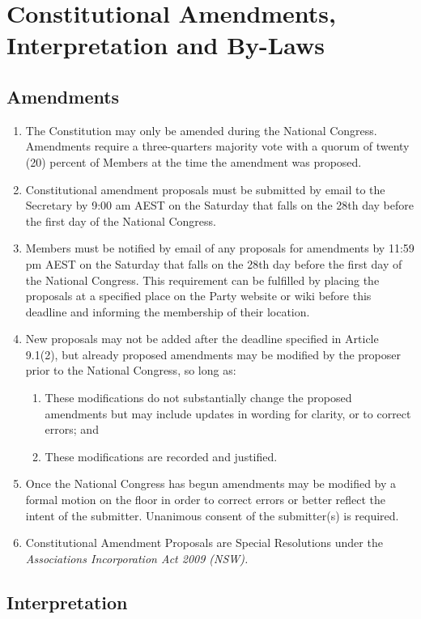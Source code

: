 \documentclass[a4paper,titlepage,8.5pt]{article}
\begin{document}
\section{Constitutional Amendments, Interpretation and By-Laws}

\subsection{Amendments}

\begin{enumerate}
\item The Constitution may only be amended during the National Congress. Amendments require a three-quarters majority vote with a quorum of twenty (20) percent of Members at the time the amendment was proposed.
\item Constitutional amendment proposals must be submitted by email to the Secretary by 9:00 am AEST on the Saturday that falls on the 28th day before the first day of the National Congress.
\item Members must be notified by email of any proposals for amendments by 11:59 pm AEST on the Saturday that falls on the 28th day before the first day of the National Congress. This requirement can be fulfilled by placing the proposals at a specified place on the Party website or wiki before this deadline and informing the membership of their location.
\item New proposals may not be added after the deadline specified in Article 9.1(2), but already proposed amendments may be modified by the proposer prior to the National Congress, so long as:
\begin{enumerate}
  \item These modifications do not substantially change the proposed amendments but may include updates in wording for clarity, or to correct errors; and
  \item These modifications are recorded and justified.
\end{enumerate}
\item Once the National Congress has begun amendments may be modified by a formal motion on the floor in order to correct errors or better reflect the intent of the submitter. Unanimous consent of the submitter(s) is required.
\item Constitutional Amendment Proposals are Special Resolutions under the \textit{Associations Incorporation Act 2009 (NSW).}
\end{enumerate}

\subsection{Interpretation}
\end{document}

